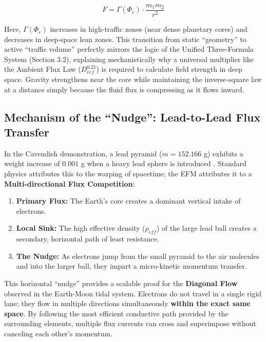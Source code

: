 \documentclass[11pt, a4paper]{article}
\begin{document}
\begin{equation}
  F = \Gamma(\Phi_e) \cdot \frac{m_1 m_2}{r^2}
\end{equation}

Here, $\Gamma(\Phi_e)$ increases in high-traffic zones (near dense planetary cores) and decreases in deep-space lean zones. This transition from static ``geometry'' to active ``traffic volume'' perfectly mirrors the logic of the Unified Three-Formula System (Section 3.2), explaining mechanistically why a universal multiplier like the Ambient Flux Law ($D_{ref}^{0.21}$) is required to calculate field strength in deep space. Gravity strengthens near the core while maintaining the inverse-square law at a distance simply because the fluid flux is compressing as it flows inward.

\subsection{Mechanism of the ``Nudge'': Lead-to-Lead Flux Transfer}
In the Cavendish demonstration, a lead pyramid ($m = 152.166$ g) exhibits a weight increase of $0.001$ g when a heavy lead sphere is introduced \cite{flashminute2026}. Standard physics attributes this to the warping of spacetime; the EFM attributes it to a \textbf{Multi-directional Flux Competition}:
\begin{enumerate}
  \item \textbf{Primary Flux:} The Earth’s core creates a dominant vertical intake of electrons.
  \item \textbf{Local Sink:} The high effective density ($\rho_{eff}$) of the large lead ball creates a secondary, horizontal path of least resistance.
  \item \textbf{The Nudge:} As electrons jump from the small pyramid to the air molecules and into the larger ball, they impart a micro-kinetic momentum transfer.
\end{enumerate}

This horizontal ``nudge'' provides a scalable proof for the \textbf{Diagonal Flow} observed in the Earth-Moon tidal system. Electrons do not travel in a single rigid lane; they flow in multiple directions simultaneously \textbf{within the exact same space}. By following the most efficient conductive path provided by the surrounding elements, multiple flux currents can cross and superimpose without canceling each other's momentum.
\end{document}
